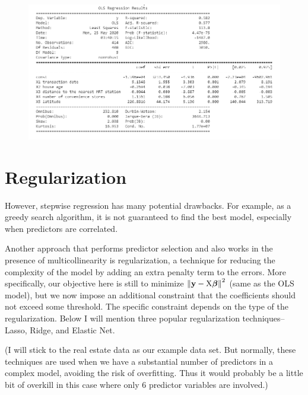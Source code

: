 \documentclass{article}
\begin{document}
\begin{figure}[H]\includegraphics[width=\linewidth]{32}\end{figure}

\section*{Regularization}
However, stepwise regression has many potential drawbacks. For example, as a greedy search algorithm, it is not guaranteed to find the best model, especially when predictors are correlated.

Another approach that performs predictor selection and also works in the presence of multicollinearity is regularization, a technique for reducing the complexity of the model by adding an extra penalty term to the errors. More specifically, our objective here is still to minimize $\norm{\mathbf{y} - \text{X} \bm{\beta}}^2$ (same as the OLS model), but we now impose an additional constraint that the coefficients should not exceed some threshold. The specific constraint depends on the type of the regularization. Below I will mention three popular regularization techniques--Lasso, Ridge, and Elastic Net.

(I will stick to the real estate data as our example data set. But normally, these techniques are used when we have a substantial number of predictors in a complex model, avoiding the risk of overfitting. Thus it would probably be a little bit of overkill in this case where only 6 predictor variables are involved.)
\end{document}
